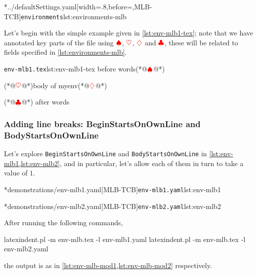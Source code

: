 	\cmhlistingsfromfile[style=modifylinebreaksEnv]*{../defaultSettings.yaml}[width=.8\linewidth,before=\centering,MLB-TCB]{\texttt{environments}}{lst:environments-mlb}

	Let's begin with the simple example given in \cref{lst:env-mlb1-tex}; note that we have annotated key parts of the file using $\color{red}\spadesuit$,
	$\color{red}\heartsuit$, $\color{red}\diamondsuit$ and $\color{red}\clubsuit$, these will be related to fields specified in \cref{lst:environments-mlb}.

	\begin{cmhlistings}[style=tcblatex,escapeinside={(*@}{@*)}]{\texttt{env-mlb1.tex}}{lst:env-mlb1-tex}
before words(*@$\color{red}\spadesuit$@*) \begin{myenv}(*@$\color{red}\heartsuit$@*)body of myenv(*@$\color{red}\diamondsuit$@*)\end{myenv}(*@$\color{red}\clubsuit$@*) after words
\end{cmhlistings}

\subsubsection{Adding line breaks: BeginStartsOnOwnLine and BodyStartsOnOwnLine}
	Let's explore \texttt{BeginStartsOnOwnLine} and \texttt{BodyStartsOnOwnLine} in \cref{lst:env-mlb1,lst:env-mlb2}, and in particular,
	let's allow each of them in turn to take a value of $1$.

	\begin{minipage}{.45\textwidth}
		\cmhlistingsfromfile[style=yaml-LST]*{demonstrations/env-mlb1.yaml}[MLB-TCB]{\texttt{env-mlb1.yaml}}{lst:env-mlb1}
	\end{minipage}
	\hfill
	\begin{minipage}{.45\textwidth}
		\cmhlistingsfromfile[style=yaml-LST]*{demonstrations/env-mlb2.yaml}[MLB-TCB]{\texttt{env-mlb2.yaml}}{lst:env-mlb2}
	\end{minipage}

	After running the following commands,
	\begin{commandshell}
latexindent.pl -m env-mlb.tex -l env-mlb1.yaml
latexindent.pl -m env-mlb.tex -l env-mlb2.yaml
\end{commandshell}
	the output is as in \cref{lst:env-mlb-mod1,lst:env-mlb-mod2} respectively.

	\begin{widepage}
		\begin{minipage}{.56\linewidth}
		\end{minipage}
		\hfill
		\begin{minipage}{.43\linewidth}
		\end{minipage}
	\end{widepage}

